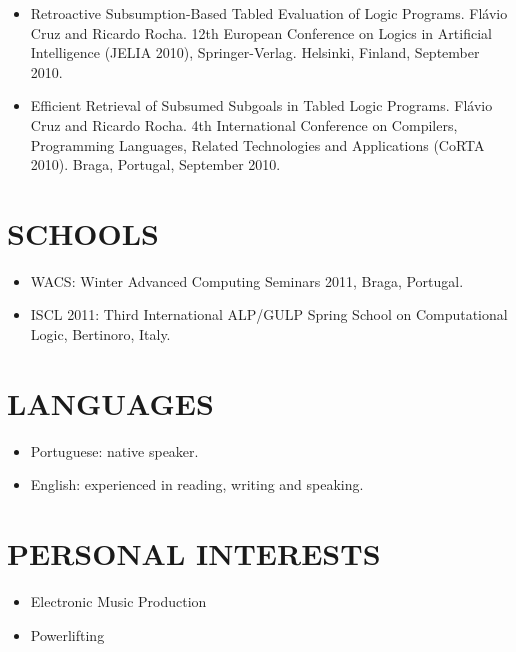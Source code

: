 \documentclass[margin]{res}
\begin{document}
\begin{resume}
\begin{itemize}
      \item Retroactive Subsumption-Based Tabled Evaluation of Logic Programs.
      Flávio Cruz and Ricardo Rocha. 12th European Conference on Logics in Artificial Intelligence (JELIA 2010), Springer-Verlag. Helsinki, Finland, September 2010.
      \item Efficient Retrieval of Subsumed Subgoals in Tabled Logic Programs.
      Flávio Cruz and Ricardo Rocha. 4th International Conference on Compilers, Programming Languages, Related Technologies and Applications (CoRTA 2010). Braga, Portugal, September 2010.
   \end{itemize}

\newpage
   
\section{SCHOOLS}
   \begin{itemize}
      \item WACS: Winter Advanced Computing Seminars 2011, Braga, Portugal.
      \item ISCL 2011: Third International ALP/GULP Spring School on Computational Logic, Bertinoro, Italy.
   \end{itemize}

\section{LANGUAGES}
      \begin{itemize}
        \item Portuguese: native speaker.
        \item English: experienced in reading, writing and speaking.
      \end{itemize}

\section{PERSONAL INTERESTS}

   \begin{itemize}
      \item Electronic Music Production
      \item Powerlifting
   \end{itemize}

\end{resume}
\end{document}
